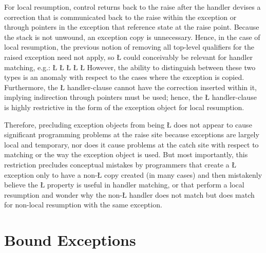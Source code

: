\documentclass[openright,twoside]{report}
\begin{document}
For local resumption, control returns back to the raise after the handler devises a correction that is communicated back to the raise within the exception or through pointers in the exception that reference state at the raise point.
Because the stack is not unwound, an exception copy is unnecessary.
Hence, in the case of local resumption, the previous notion of removing all top-level qualifiers for the raised exception need not apply, so \LGinlinetrue\LGbegin\lgrinde\L{}\endlgrinde\LGend{} could conceivably be relevant for handler matching, e.g.:
\LGinlinefalse\LGbegin\lgrinde
\L{}
\L{\LB{}}
\L{}
\CE{}\L{}
\L{\LB{\}}}
\endlgrinde\LGend
However, the ability to distinguish between these two types is an anomaly with respect to the cases where the exception is copied.
Furthermore, the \LGinlinetrue\LGbegin\lgrinde\L{}\endlgrinde\LGend{} handler-clause cannot have the correction inserted within it, implying indirection through pointers must be used;
hence, the \LGinlinetrue\LGbegin\lgrinde\L{}\endlgrinde\LGend{} handler-clause is highly restrictive in the form of the exception object for local resumption.

Therefore, precluding exception objects from being \LGinlinetrue\LGbegin\lgrinde\L{}\endlgrinde\LGend{} does not appear to cause significant programming problems at the raise site because exceptions are largely local and temporary, nor does it cause problems at the catch site with respect to matching or the way the exception object is used.
But most importantly, this restriction precludes conceptual mistakes by programmers that create a \LGinlinetrue\LGbegin\lgrinde\L{}\endlgrinde\LGend{} exception only to have a non-\LGinlinetrue\LGbegin\lgrinde\L{}\endlgrinde\LGend{} copy created (in many cases) and then mistakenly believe the \LGinlinetrue\LGbegin\lgrinde\L{}\endlgrinde\LGend{} property is useful in handler matching, or that perform a local resumption and wonder why the non-\LGinlinetrue\LGbegin\lgrinde\L{}\endlgrinde\LGend{} handler does not match but does match for non-local resumption with the same exception.


\section{Bound Exceptions}
\label{s:BoundExceptions}
\end{document}

